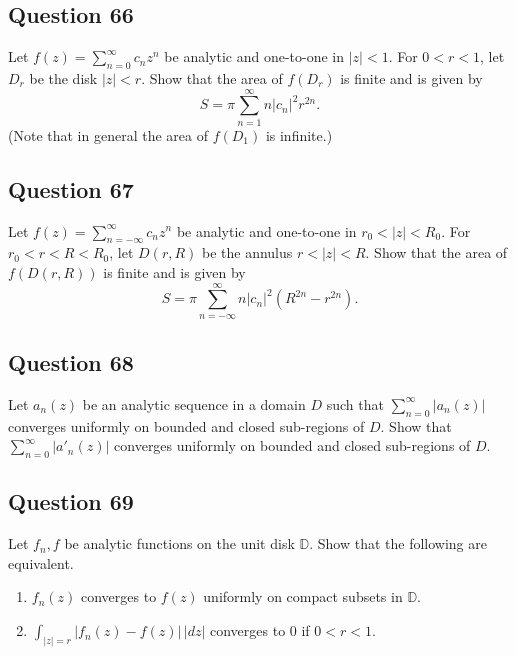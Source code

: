 \documentclass[12pt]{article}
\begin{document}
\hypertarget{question-66-2}{%
\subsection{Question 66}\label{question-66-2}}

Let \(f(z) = \sum_{n=0}^\infty c_n z^n\) be analytic and one-to-one in
\(|z| < 1\). For \(0<r<1\), let \(D_r\) be the disk \(|z|<r\). Show that
the area of \(f(D_r)\) is finite and is given by
\[S = \pi \sum_{n=1}^\infty n |c_n|^2 r^{2n}.\] (Note that in general
the area of \(f(D_1)\) is infinite.)

\hypertarget{question-67-2}{%
\subsection{Question 67}\label{question-67-2}}

Let \(f(z) = \sum_{n= -\infty}^\infty c_n z^n\) be analytic and
one-to-one in \(r_0< |z| < R_0\). For \(r_0<r<R<R_0\), let \(D(r,R)\) be
the annulus \(r<|z|<R\). Show that the area of \(f(D(r,R))\) is finite
and is given by
\[S = \pi \sum_{n=- \infty}^\infty n |c_n|^2 (R^{2n} - r^{2n}).\]

\hypertarget{question-68-2}{%
\subsection{Question 68}\label{question-68-2}}

Let \(a_n(z)\) be an analytic sequence in a domain \(D\) such that
\(\displaystyle \sum_{n=0}^\infty |a_n(z)|\) converges uniformly on
bounded and closed sub-regions of \(D\). Show that
\(\displaystyle \sum_{n=0}^\infty |a'_n(z)|\) converges uniformly on
bounded and closed sub-regions of \(D\).

\hypertarget{question-69-2}{%
\subsection{Question 69}\label{question-69-2}}

Let \(f_n, f\) be analytic functions on the unit disk \({\mathbb D}\).
Show that the following are equivalent.

\begin{enumerate}
\def\labelenumi{(\roman{enumi})}
\item
  \(f_n(z)\) converges to \(f(z)\) uniformly on compact subsets in
  \(\mathbb D\).
\item
  \(\int_{|z|= r} |f_n(z) - f(z)| \, |dz|\) converges to \(0\) if
  \(0< r<1\).
\end{enumerate}
\end{document}

